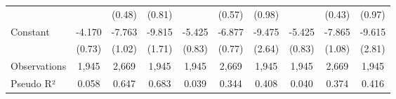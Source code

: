 {\begin{tabular}{l*{9}{c}}
                    &                     &      (0.48)         &      (0.81)         &                     &      (0.57)         &      (0.98)         &                     &      (0.43)         &      (0.97)         \\
Constant            &      -4.170\sym{***}&      -7.763\sym{***}&      -9.815\sym{***}&      -5.425\sym{***}&      -6.877\sym{***}&      -9.475\sym{***}&      -5.425\sym{***}&      -7.865\sym{***}&      -9.615\sym{***}\\
                    &      (0.73)         &      (1.02)         &      (1.71)         &      (0.83)         &      (0.77)         &      (2.64)         &      (0.83)         &      (1.08)         &      (2.81)         \\
\midrule
Observations        &       1,945         &       2,669         &       1,945         &       1,945         &       2,669         &       1,945         &       1,945         &       2,669         &       1,945         \\
Pseudo R²           &       0.058         &       0.647         &       0.683         &       0.039         &       0.344         &       0.408         &       0.040         &       0.374         &       0.416         \\
\bottomrule
\end{tabular}
}
